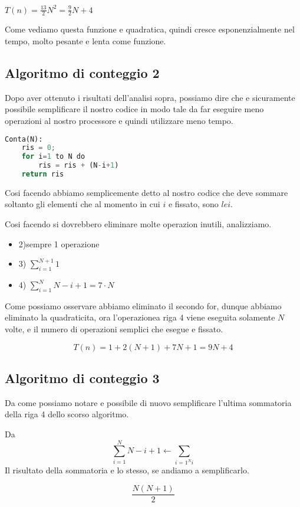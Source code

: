 $T(n) = \frac{13}{2}N^2 = \frac{9}{2}N + 4$

Come vediamo questa funzione e quadratica, quindi cresce esponenzialmente nel tempo, molto pesante e lenta come funzione.



\subsection{Algoritmo di conteggio 2}
Dopo aver ottenuto i risultati dell'analisi sopra, possiamo dire che e sicuramente possibile semplificare il nostro codice in modo tale da far eseguire meno operazioni al nostro processore e quindi utilizzare meno tempo.
\\

\begin{lstlisting}[language=Python]
Conta(N):
	ris = 0;
	for i=1 to N do
		ris = ris + (N-i+1)
	return ris
\end{lstlisting}

Cosi facendo abbiamo semplicemente detto al nostro codice che deve sommare soltanto gli elementi che al momento in cui $i$ e fissato, sono $le i$.

Cosi facendo si dovrebbero eliminare molte operazion inutili, analizziamo.

\begin{itemize}
\item 2)sempre 1 operazione
\item 3) $\sum_{i=1}^{N+1} 1$
\item 4) $\sum_{i=1}^{N} N-i+1 = 7\cdot N $
\end{itemize}

Come possiamo osservare abbiamo eliminato il secondo for, dunque abbiamo eliminato la quadraticita, ora l'operazionea riga 4 viene eseguita solamente $N$ volte, e il numero di operazioni semplici che esegue e fissato.

$$T(n) = 1 + 2(N+1) + 7N + 1 = 9N+4$$

\subsection{Algoritmo di conteggio 3}
Da come possiamo notare e possibile di nuovo semplificare l'ultima sommatoria della riga 4 dello scorso algoritmo.

Da $$\sum_{i=1}^{N} N-i+1 \leftarrow \sum_{i=1^{N} i }$$
Il risultato della sommatoria e lo stesso, se andiamo a semplificarlo.

$$\frac{N(N+1)}{2}$$

